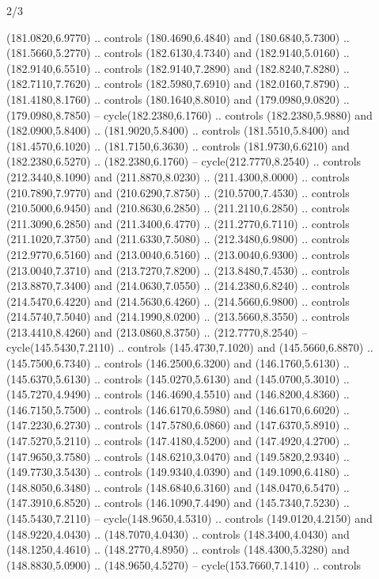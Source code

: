 \begin{flagdescription}{2/3}
\begin{scope}[xshift=0.5\flaglength,yshift=0.5\flagwidth,scale=\stretchfactor]
\begin{scope}[scale=0.001645\flagwidth,yshift=65mm,xshift=-63mm]
\begin{scope}[y=0.80pt, x=0.80pt, yscale=-1,]
\begin{scope}[cm={{1.33333,0.0,0.0,1.33333,(0.0,1e-05)}}]
  (181.0820,6.9770) .. controls (180.4690,6.4840) and (180.6840,5.7300) ..
  (181.5660,5.2770) .. controls (182.6130,4.7340) and (182.9140,5.0160) ..
  (182.9140,6.5510) .. controls (182.9140,7.2890) and (182.8240,7.8280) ..
  (182.7110,7.7620) .. controls (182.5980,7.6910) and (182.0160,7.8790) ..
  (181.4180,8.1760) .. controls (180.1640,8.8010) and (179.0980,9.0820) ..
  (179.0980,8.7850) -- cycle(182.2380,6.1760) .. controls (182.2380,5.9880) and
  (182.0900,5.8400) .. (181.9020,5.8400) .. controls (181.5510,5.8400) and
  (181.4570,6.1020) .. (181.7150,6.3630) .. controls (181.9730,6.6210) and
  (182.2380,6.5270) .. (182.2380,6.1760) -- cycle(212.7770,8.2540) .. controls
  (212.3440,8.1090) and (211.8870,8.0230) .. (211.4300,8.0000) .. controls
  (210.7890,7.9770) and (210.6290,7.8750) .. (210.5700,7.4530) .. controls
  (210.5000,6.9450) and (210.8630,6.2850) .. (211.2110,6.2850) .. controls
  (211.3090,6.2850) and (211.3400,6.4770) .. (211.2770,6.7110) .. controls
  (211.1020,7.3750) and (211.6330,7.5080) .. (212.3480,6.9800) .. controls
  (212.9770,6.5160) and (213.0040,6.5160) .. (213.0040,6.9300) .. controls
  (213.0040,7.3710) and (213.7270,7.8200) .. (213.8480,7.4530) .. controls
  (213.8870,7.3400) and (214.0630,7.0550) .. (214.2380,6.8240) .. controls
  (214.5470,6.4220) and (214.5630,6.4260) .. (214.5660,6.9800) .. controls
  (214.5740,7.5040) and (214.1990,8.0200) .. (213.5660,8.3550) .. controls
  (213.4410,8.4260) and (213.0860,8.3750) .. (212.7770,8.2540) --
  cycle(145.5430,7.2110) .. controls (145.4730,7.1020) and (145.5660,6.8870) ..
  (145.7500,6.7340) .. controls (146.2500,6.3200) and (146.1760,5.6130) ..
  (145.6370,5.6130) .. controls (145.0270,5.6130) and (145.0700,5.3010) ..
  (145.7270,4.9490) .. controls (146.4690,4.5510) and (146.8200,4.8360) ..
  (146.7150,5.7500) .. controls (146.6170,6.5980) and (146.6170,6.6020) ..
  (147.2230,6.2730) .. controls (147.5780,6.0860) and (147.6370,5.8910) ..
  (147.5270,5.2110) .. controls (147.4180,4.5200) and (147.4920,4.2700) ..
  (147.9650,3.7580) .. controls (148.6210,3.0470) and (149.5820,2.9340) ..
  (149.7730,3.5430) .. controls (149.9340,4.0390) and (149.1090,6.4180) ..
  (148.8050,6.3480) .. controls (148.6840,6.3160) and (148.0470,6.5470) ..
  (147.3910,6.8520) .. controls (146.1090,7.4490) and (145.7340,7.5230) ..
  (145.5430,7.2110) -- cycle(148.9650,4.5310) .. controls (149.0120,4.2150) and
  (148.9220,4.0430) .. (148.7070,4.0430) .. controls (148.3400,4.0430) and
  (148.1250,4.4610) .. (148.2770,4.8950) .. controls (148.4300,5.3280) and
  (148.8830,5.0900) .. (148.9650,4.5270) -- cycle(153.7660,7.1410) .. controls

\end{scope}
\end{scope}
\end{scope}
\end{scope}
\end{flagdescription}

